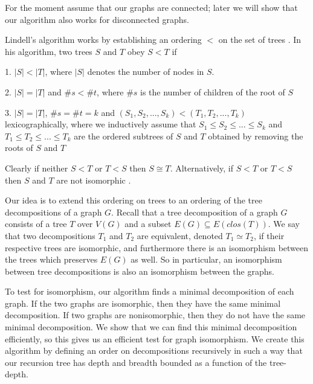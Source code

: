 \documentclass[11pt]{report}
\begin{document}
For the moment assume that our graphs are connected; later we will show that our algorithm also works for disconnected graphs.

Lindell's algorithm works by establishing an ordering $<$ on the set of trees \cite{Lindell92}. In his algorithm, two trees $S$ and $T$ obey $S<T$ if

1. $|S|<|T|$, where $|S|$ denotes the number of nodes in $S$.

2. $|S|=|T|$ and $\#s < \#t$, where $\#s$ is the number of children of the root of $S$

3. $|S|=|T|$,  $\#s = \#t = k$ and $(S_1, S_2, ... ,S_k) < (T_1, T_2, ..., T_k)$ lexicographically, where we inductively assume that $S_1 \leq S_2 \leq ... \leq S_k$ and $T_1 \leq T_2 \leq ... \leq T_k$ are the ordered subtrees of $S$ and $T$ obtained by removing the roots of $S$ and $T$

Clearly if neither $S<T$ or $T<S$ then $S \cong T$. Alternatively, if $S<T$ or $T<S$ then $S$ and $T$ are not isomorphic \cite{Lindell92}. 

Our idea is to extend this ordering on trees to an ordering of the tree decompositions of a graph $G$. Recall that a tree decomposition of a graph $G$ consists of a tree $T$ over $V(G)$ and a subset $E(G)\subseteq E(clos(T))$. We say that two decompositions $T_1$ and $T_2$ are equivalent, denoted $T_1 \simeq T_2$, if their respective trees are isomorphic, and furthermore there is an isomorphism between the trees which preserves $E(G)$ as well. So in particular, an isomorphism between tree decompositions is also an isomorphism between the graphs.


To test for isomorphism, our algorithm finds a minimal decomposition of each graph. If the two graphs are isomorphic, then they have the same minimal decomposition. If two graphs are nonisomorphic, then they do not have the same minimal decomposition. We show that we can find this minimal decomposition efficiently, so this gives us an efficient test for graph isomorphism. We create this algorithm by defining an order on decompositions recursively in such a way that our recursion tree has depth and breadth bounded as a function of the tree-depth. 
\end{document}
